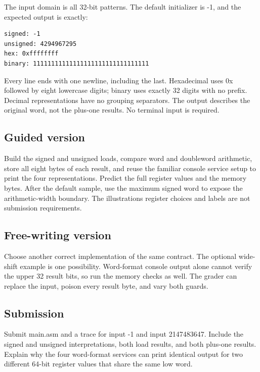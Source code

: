 The input domain is all 32-bit patterns. The default initializer is -1,
and the expected output is exactly:

\begin{verbatim}
signed: -1
unsigned: 4294967295
hex: 0xffffffff
binary: 11111111111111111111111111111111
\end{verbatim}

Every line ends with one newline, including the last. Hexadecimal uses
0x followed by eight lowercase digits; binary uses exactly 32 digits
with no prefix. Decimal representations have no grouping separators. The
output describes the original word, not the plus-one results. No
terminal input is required.

\subsection{Guided
  version}\label{004-bit-inspector-assignment-guided-version}

Build the signed and unsigned loads, compare word and doubleword
arithmetic, store all eight bytes of each result, and reuse the familiar
console service setup to print the four representations. Predict the
full register values and the memory bytes. After the default sample, use
the maximum signed word to expose the arithmetic-width boundary. The
illustration\textquotesingle s register choices and labels are not
submission requirements.

\subsection{Free-writing
  version}\label{004-bit-inspector-assignment-free-writing-version}

Choose another correct implementation of the same contract. The optional
wide-shift example is one possibility. Word-format console output alone
cannot verify the upper 32 result bits, so run the memory checks as
well. The grader can replace the input, poison every result byte, and
vary both guards.

\subsection{Submission}\label{004-bit-inspector-assignment-submission}

Submit main.asm and a trace for input -1 and input 2147483647. Include
the signed and unsigned interpretations, both load results, and both
plus-one results. Explain why the four word-format services can print
identical output for two different 64-bit register values that share the
same low word.
